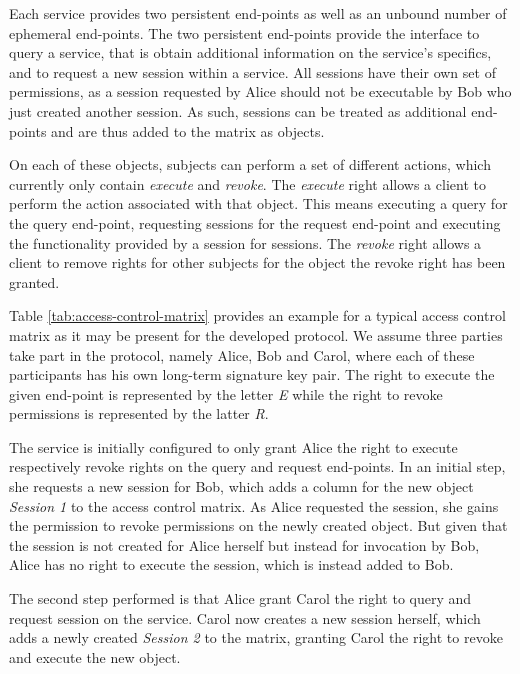 Each service provides two persistent end-points as well as an unbound number of ephemeral end-points.
The two persistent end-points provide the interface to query a service, that is obtain additional information on the service's specifics, and to request a new session within a service.
All sessions have their own set of permissions, as a session requested by Alice should not be executable by Bob who just created another session.
As such, sessions can be treated as additional end-points and are thus added to the matrix as objects.

On each of these objects, subjects can perform a set of different actions, which currently only contain \emph{execute} and \emph{revoke}.
The \emph{execute} right allows a client to perform the action associated with that object.
This means executing a query for the query end-point, requesting sessions for the request end-point and executing the functionality provided by a session for sessions.
The \emph{revoke} right allows a client to remove rights for other subjects for the object the revoke right has been granted.

Table \ref{tab:access-control-matrix} provides an example for a typical access control matrix as it may be present for the developed protocol.
We assume three parties take part in the protocol, namely Alice, Bob and Carol, where each of these participants has his own long-term signature key pair.
The right to execute the given end-point is represented by the letter \emph{E} while the right to revoke permissions is represented by the latter \emph{R}.

The service is initially configured to only grant Alice the right to execute respectively revoke rights on the query and request end-points.
In an initial step, she requests a new session for Bob, which adds a column for the new object \emph{Session 1} to the access control matrix.
As Alice requested the session, she gains the permission to revoke permissions on the newly created object.
But given that the session is not created for Alice herself but instead for invocation by Bob, Alice has no right to execute the session, which is instead added to Bob.

The second step performed is that Alice grant Carol the right to query and request session on the service.
Carol now creates a new session herself, which adds a newly created \emph{Session 2} to the matrix, granting Carol the right to revoke and execute the new object.

